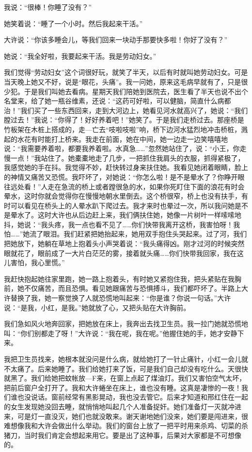 我说：“很棒！你睡了没有？” 

她笑着说：“睡了一个小时。然后我起来干活。” 

大许说：“你该多睡会儿，等我们回来一块动手那要快多啦！你好了没有？” 

她说：“我全好啦，我要起来干活。我是劳动妇女。” 

我们觉得“劳动妇女”这个词很好玩，就笑了半天，以后有时就叫她劳动妇女。可是当天晚上她又不好，说是“眼花，头痛”。我一问她，原来这毛病早就有了，只是很少犯。于是我们叫她去看病。星期天我们陪她到医院去，医生看了半天也说不出个名堂来，给了她一瓶谷维素，还说：“这药可好啦，可以健脑，简直什么病都治！”我们买了一些东西回来，走到大河边上，她看见河水就高兴了，她说：“我们膛过去！”我说：“你得了！好好养着吧！”她笑了。于是我们走桥过去。那座桥是竹板架在木桩上搭成的，走—亡去“吱啦吱啦”响，桥下边河水猛烈地冲击桥桩，溅起的水花有时能打上桥来。我走在前面，她在中间，她一边走一边笑嘻嘻地说：“我需要养着啦，都要我养着啦。水真急……”忽然她站住了，说：“小王，你走慢一点！”我站住了。她橐橐地走了几步，一把抓住我肩头的衣服，抓得紧极了，我感觉她的手在抖。我觉得不妙，赶快转过身来扶住她。我看见她闭着眼睛，脸上的神情又痛苦又恐慌。我吓坏了，对她说：“你怎么啦！是不是晕水了？你睁开眼往远处看！”人走在急流的桥上或者蹚很急的水，如果你死盯住下面的浪花有时会晕水，这时你就会觉得你在慢慢地朝水里倒去。这个桥很窄，桥上也没有扶手，有时可以看见在桥头上的人晕水趴下爬过去。我才来时也晕过一次，所以我问她是不是晕水了。这时大许也从后边赶上来，我们俩扶住她，她像一片树叶一样嗦嗦地抖，她说：“我头疼，我一点也看不见了……你们快带我离开这桥，我害怕呀！我怕……”她流了眼泪。我们赶紧把她抬起来，她用双手抱住头哭起来。过了河，我们把她放下，她躺在草地上抱着头小声哭着说：“我头痛得凶。刚才过河的时候突然眼就花了，眼前成了一大片白茫茫的雾，接着就头痛……你们快带我回家，我在这儿害怕，我心里慌。” 

我赶快抱起她往家里跑，她一路上抱着头，有时她又紧抱住我，把头紧贴在我胸前，她不仅痛苦，而且恐惧。看见她跟痛苦与恐惧搏斗，我们都吓坏了。半路上大许替换了我，她一察觉换了人就恐慌地叫起来：“你是谁？你说一句话。”大许说：“是我，小红，是我。”她就放了心，又把头贴在大许胸前。 

我们急如风火地奔回家，把她放在床上，我奔出去找卫生员。我一拉门她就恐慌地叫：“你们别都走了呀！”大许说：“我在呢，我在呢。”他握住她的手，她才安静下来。 

我把卫生员找来，她根本就没问是什么病，就给她打了一针止痛针，小红一会儿就不太痛了。后来她睡了。我们给她打来了饭，可是我们自己却没有吃什么。天很快就黑了。我们给她把蚊帐放—F来，在窗上点起了煤油灯。我们又害怕空气太坏，把前后窗户全打开了。我和大许蜷坐在床上，谁也没有睡。这真是凄惨的一夜！我们谁也没说话。窗前经常有黑影晃动，我也没去管它。后来才知道和邢红住在一起的女生发现她没回去睡，就悄悄地叫起几个人准备捉奸。她们准备灯一灭就冲进来，可是灯一直没灭，她们也就没敢来。谢天谢地她们没来，她们要是闯进来，很难想像我和大许会做出什么举动。我们的窗台上放了一把平时用来杀鸡、切菜的杀猪刀，当时我们肯定会想起来用它。要是出了这种事，后果对大家都是不可想像的。 

